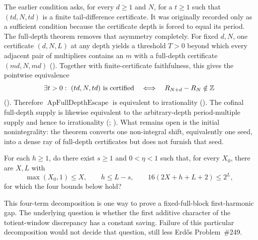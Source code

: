 \documentclass[11pt]{article}
\begin{document}
The earlier condition
asks, for every $d\ge1$ and $N$, for a $t\ge1$ such that $(td,N,td)$ is a
finite tail-difference certificate.  It was originally recorded only as a
sufficient condition because the certificate depth is forced to equal its
period.  The full-depth theorem removes that asymmetry completely.
For fixed $d,N$, one certificate $(d,N,L)$ at any depth yields a threshold
$T>0$ beyond which every adjacent pair of multipliers contains an $m$ with a
full-depth certificate $(md,N,md)$
().
Together with finite-certificate faithfulness, this gives the pointwise
equivalence
\[
 \exists t>0:\ (td,N,td)\text{ is certified}
 \quad\Longleftrightarrow\quad R_{N+d}-R_N\notin\Z
\]
().
Therefore $\operatorname{ApFullDepthEscape}$ is equivalent to irrationality
().
The cofinal full-depth supply is likewise equivalent to the arbitrary-depth
period-multiple supply and hence to irrationality
(;
).
What remains open is the initial nonintegrality: the theorem converts one
non-integral shift, equivalently one seed, into a dense ray of full-depth
certificates but does not furnish that seed.

\begin{problem}
\label{prob:firstharmonic}
For each $h\ge1$, do there exist $s\ge1$ and $0<\eta<1$ such that, for every
$X_0$, there are $X,L$ with
\[
 \max(X_0,1)\le X,\qquad h\le L-s,\qquad
 16(2X+h+L+2)\le2^L,
\]
for which the four bounds below hold?
\end{problem}

\noindent This four-term decomposition is one way to prove a fixed-full-block
first-harmonic gap.  The underlying question is whether the first additive
character of the totient-window discrepancy has a constant saving.  Failure
of this particular decomposition would not decide that question, still less
Erd\H{o}s Problem~\#249.
\end{document}
